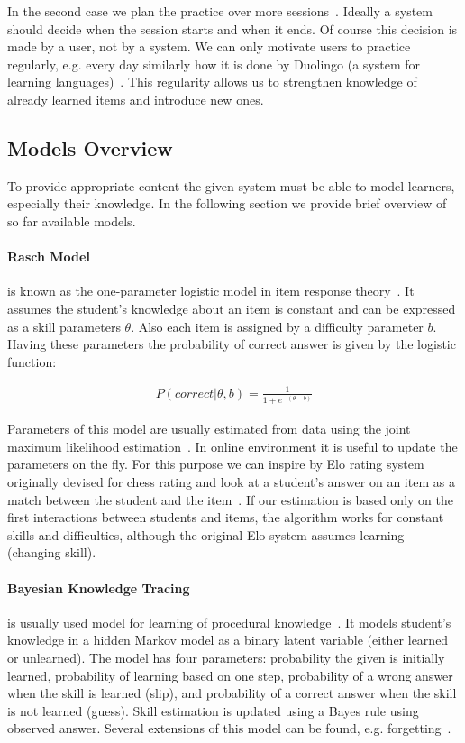 \documentclass[table,color,cover,twoside,nolot,nolof]{fithesis3/fithesis3}
\begin{document}
In the second case we plan the practice over more
sessions~\cite{kang2014retrieval}. Ideally a system should decide when the
session starts and when it ends. Of course this decision is made by a user,
not by a system. We can only motivate users to practice regularly, e.g. every
day similarly how it is done by Duolingo (a system for learning
languages)~\cite{garcia2013learning}. This regularity allows us to strengthen
knowledge of already learned items and introduce new ones.

\subsection{Models Overview}

To provide appropriate content the given system must be able to model learners,
especially their knowledge. In the following section we provide brief overview
of so far available models.

\paragraph*{Rasch Model} is known as the one-parameter logistic model in item
response theory~\cite{de2008theory}. It assumes the student's knowledge about
an item is constant and can be expressed as a skill parameters $\theta$. Also
each item is assigned by a difficulty parameter $b$. Having these parameters
the probability of correct answer is given by the logistic function:

\begin{align}
P(correct|\theta,b) = \frac{1}{1 + e^{-(\theta - b)}}
\end{align}

Parameters of this model are usually estimated from data using the joint
maximum likelihood estimation~\cite{de2008theory}. In online environment it is
useful to update the parameters on the fly. For this purpose we can inspire by
Elo rating system~\cite{elo1978rating} originally devised for chess rating and
look at a student's answer on an item as a match between the student and
the item~\cite{papousek2014adaptive}. If our estimation is based only on the
first interactions between students and items, the algorithm works for constant
skills and difficulties, although the original Elo system assumes learning (changing skill).

\paragraph*{Bayesian Knowledge Tracing} is usually used model for
learning of procedural knowledge~\cite{van2013properties}. It models student's
knowledge in a hidden Markov model as a binary latent variable (either learned
or unlearned). The model has four parameters: probability the given is
initially learned, probability of learning based on one step, probability of
a wrong answer when the skill is learned (slip), and probability of a correct
answer when the skill is not learned (guess). Skill estimation is updated using
a Bayes rule using observed answer.  Several extensions of this model can be
found, e.g.  forgetting~\cite{qiu2010does}.
\end{document}
